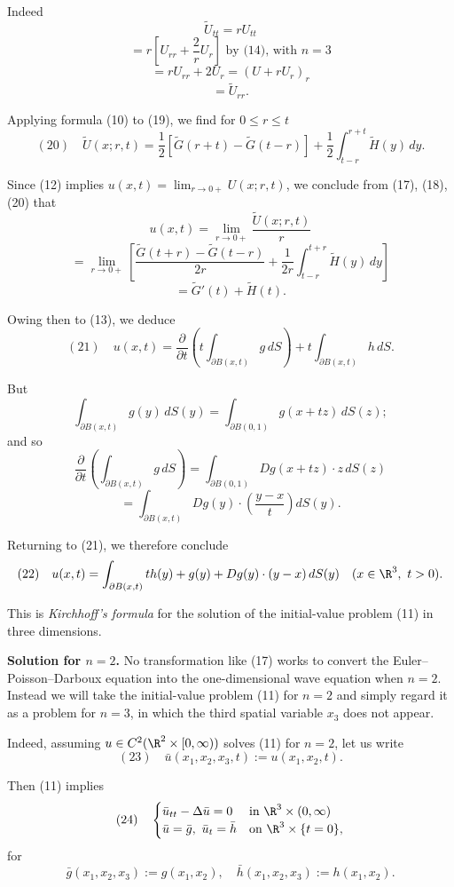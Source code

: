Indeed
$$\tilde{U}_{tt} = rU_{tt}$$
$$= r\left[U_{rr} + \frac{2}{r}U_r\right] \text{ by (14), with } n = 3$$
$$= rU_{rr} + 2U_r = (U + rU_r)_r$$
$$= \tilde{U}_{rr}.$$

Applying formula (10) to (19), we find for $0 \le r \le t$
$$(20) \quad \tilde{U}(x;r,t) = \frac{1}{2}[\tilde{G}(r+t) - \tilde{G}(t-r)] + \frac{1}{2}\int_{t-r}^{r+t} \tilde{H}(y)\, dy.$$

Since (12) implies $u(x,t) = \lim_{r \to 0+} U(x;r,t)$, we conclude from (17), (18), (20) that
$$u(x,t) = \lim_{r \to 0+} \frac{\tilde{U}(x;r,t)}{r}$$
$$= \lim_{r \to 0+} \left[\frac{\tilde{G}(t+r) - \tilde{G}(t-r)}{2r} + \frac{1}{2r}\int_{t-r}^{t+r} \tilde{H}(y)\, dy\right]$$
$$= \tilde{G}'(t) + \tilde{H}(t).$$

Owing then to (13), we deduce
$$(21) \quad u(x,t) = \frac{\partial}{\partial t}\left(t\int_{\partial B(x,t)} g\, dS\right) + t\int_{\partial B(x,t)} h\, dS.$$

But
$$\int_{\partial B(x,t)} g(y)\, dS(y) = \int_{\partial B(0,1)} g(x+tz)\, dS(z);$$
and so
$$\frac{\partial}{\partial t}\left(\int_{\partial B(x,t)} g\, dS\right) = \int_{\partial B(0,1)} Dg(x+tz) \cdot z\, dS(z)$$
$$= \int_{\partial B(x,t)} Dg(y) \cdot \left(\frac{y-x}{t}\right) dS(y).$$

Returning to (21), we therefore conclude
$$(22) \quad u(x,t) = \int_{\partial B(x,t)} th(y) + g(y) + Dg(y)\cdot(y-x)\,dS(y) \quad (x \in \R^3,\ t>0).$$

This is \textit{Kirchhoff's formula} for the solution of the initial-value problem (11) in three dimensions.

\textbf{Solution for $n=2$.} No transformation like (17) works to convert the Euler--Poisson--Darboux equation into the one-dimensional wave equation when $n=2$. Instead we will take the initial-value problem (11) for $n=2$ and simply regard it as a problem for $n=3$, in which the third spatial variable $x_3$ does not appear.

Indeed, assuming $u \in C^2(\R^2\times[0,\infty))$ solves (11) for $n=2$, let us write
$$(23) \quad \bar{u}(x_1,x_2,x_3,t) := u(x_1,x_2,t).$$

Then (11) implies
$$(24) \quad \begin{cases} \bar{u}_{tt} - \Delta\bar{u} = 0 & \text{in } \R^3\times(0,\infty) \\ \bar{u} = \bar{g},\ \bar{u}_t = \bar{h} & \text{on } \R^3\times\{t=0\}, \end{cases}$$
for
$$\bar{g}(x_1,x_2,x_3) := g(x_1,x_2), \quad \bar{h}(x_1,x_2,x_3) := h(x_1,x_2).$$

